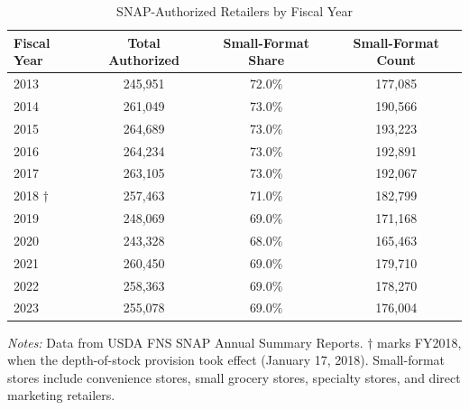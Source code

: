 \begin{table}[htbp]
\centering
\caption{SNAP-Authorized Retailers by Fiscal Year}
\label{tab:aggregate}
\begin{tabular}{lccc}
\toprule
Fiscal Year & Total Authorized & Small-Format Share & Small-Format Count \\
\midrule
2013 & 245,951 & 72.0\% & 177,085 \\
2014 & 261,049 & 73.0\% & 190,566 \\
2015 & 264,689 & 73.0\% & 193,223 \\
2016 & 264,234 & 73.0\% & 192,891 \\
2017 & 263,105 & 73.0\% & 192,067 \\
2018 $\dagger$ & 257,463 & 71.0\% & 182,799 \\
2019 & 248,069 & 69.0\% & 171,168 \\
2020 & 243,328 & 68.0\% & 165,463 \\
2021 & 260,450 & 69.0\% & 179,710 \\
2022 & 258,363 & 69.0\% & 178,270 \\
2023 & 255,078 & 69.0\% & 176,004 \\
\bottomrule
\end{tabular}
\begin{tablenotes}[flushleft]
\small
\item \textit{Notes:} Data from USDA FNS SNAP Annual Summary Reports. $\dagger$ marks FY2018, when the depth-of-stock provision took effect (January 17, 2018). Small-format stores include convenience stores, small grocery stores, specialty stores, and direct marketing retailers.
\end{tablenotes}
\end{table}

